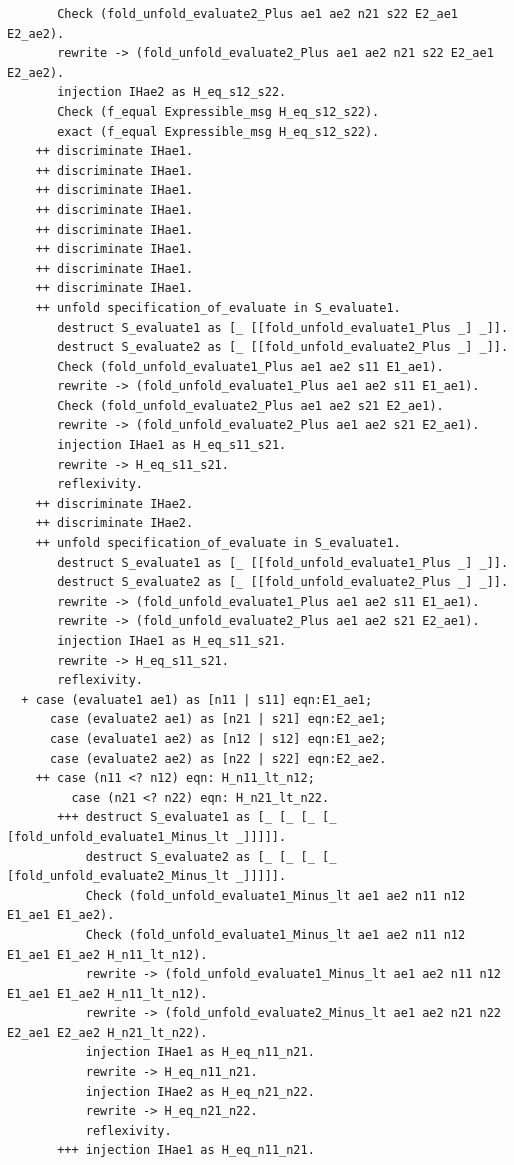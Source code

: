 \documentclass{article}
\begin{document}
\begin{lstlisting}
       Check (fold_unfold_evaluate2_Plus ae1 ae2 n21 s22 E2_ae1 E2_ae2).
       rewrite -> (fold_unfold_evaluate2_Plus ae1 ae2 n21 s22 E2_ae1 E2_ae2).
       injection IHae2 as H_eq_s12_s22.
       Check (f_equal Expressible_msg H_eq_s12_s22).
       exact (f_equal Expressible_msg H_eq_s12_s22).
    ++ discriminate IHae1.
    ++ discriminate IHae1.
    ++ discriminate IHae1.
    ++ discriminate IHae1.
    ++ discriminate IHae1.
    ++ discriminate IHae1.
    ++ discriminate IHae1.
    ++ discriminate IHae1.
    ++ unfold specification_of_evaluate in S_evaluate1.
       destruct S_evaluate1 as [_ [[fold_unfold_evaluate1_Plus _] _]].
       destruct S_evaluate2 as [_ [[fold_unfold_evaluate2_Plus _] _]].
       Check (fold_unfold_evaluate1_Plus ae1 ae2 s11 E1_ae1).
       rewrite -> (fold_unfold_evaluate1_Plus ae1 ae2 s11 E1_ae1).
       Check (fold_unfold_evaluate2_Plus ae1 ae2 s21 E2_ae1).
       rewrite -> (fold_unfold_evaluate2_Plus ae1 ae2 s21 E2_ae1).
       injection IHae1 as H_eq_s11_s21.
       rewrite -> H_eq_s11_s21.
       reflexivity.
    ++ discriminate IHae2.
    ++ discriminate IHae2.
    ++ unfold specification_of_evaluate in S_evaluate1.
       destruct S_evaluate1 as [_ [[fold_unfold_evaluate1_Plus _] _]].
       destruct S_evaluate2 as [_ [[fold_unfold_evaluate2_Plus _] _]].
       rewrite -> (fold_unfold_evaluate1_Plus ae1 ae2 s11 E1_ae1).
       rewrite -> (fold_unfold_evaluate2_Plus ae1 ae2 s21 E2_ae1).
       injection IHae1 as H_eq_s11_s21.
       rewrite -> H_eq_s11_s21.
       reflexivity.
  + case (evaluate1 ae1) as [n11 | s11] eqn:E1_ae1;
      case (evaluate2 ae1) as [n21 | s21] eqn:E2_ae1;
      case (evaluate1 ae2) as [n12 | s12] eqn:E1_ae2;
      case (evaluate2 ae2) as [n22 | s22] eqn:E2_ae2.
    ++ case (n11 <? n12) eqn: H_n11_lt_n12;
         case (n21 <? n22) eqn: H_n21_lt_n22.
       +++ destruct S_evaluate1 as [_ [_ [_ [_ [fold_unfold_evaluate1_Minus_lt _]]]]].
           destruct S_evaluate2 as [_ [_ [_ [_ [fold_unfold_evaluate2_Minus_lt _]]]]].
           Check (fold_unfold_evaluate1_Minus_lt ae1 ae2 n11 n12 E1_ae1 E1_ae2).
           Check (fold_unfold_evaluate1_Minus_lt ae1 ae2 n11 n12 E1_ae1 E1_ae2 H_n11_lt_n12).
           rewrite -> (fold_unfold_evaluate1_Minus_lt ae1 ae2 n11 n12 E1_ae1 E1_ae2 H_n11_lt_n12).
           rewrite -> (fold_unfold_evaluate2_Minus_lt ae1 ae2 n21 n22 E2_ae1 E2_ae2 H_n21_lt_n22).
           injection IHae1 as H_eq_n11_n21.
           rewrite -> H_eq_n11_n21.
           injection IHae2 as H_eq_n21_n22.
           rewrite -> H_eq_n21_n22.
           reflexivity.
       +++ injection IHae1 as H_eq_n11_n21.

\end{lstlisting}
\end{document}
